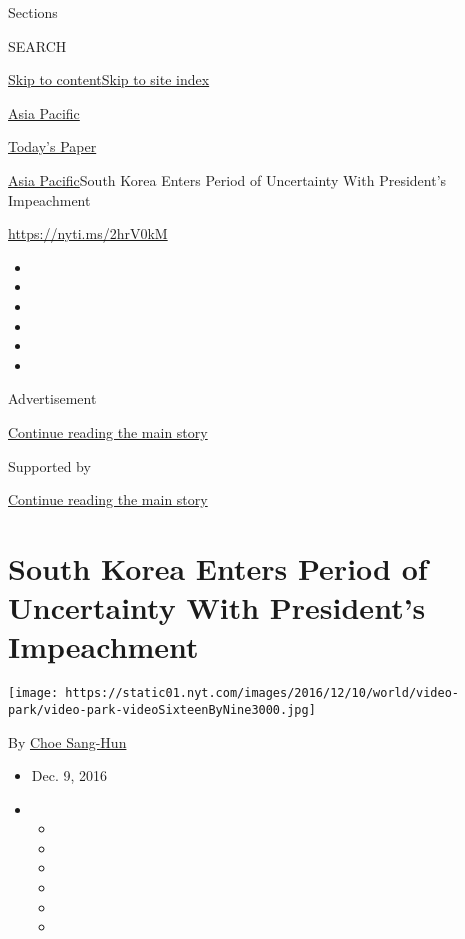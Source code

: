 Sections

SEARCH

\protect\hyperlink{site-content}{Skip to
content}\protect\hyperlink{site-index}{Skip to site index}

\href{https://www.nytimes.com/section/world/asia}{Asia Pacific}

\href{https://myaccount.nytimes.com/auth/login?response_type=cookie\&client_id=vi}{}

\href{https://www.nytimes.com/section/todayspaper}{Today's Paper}

\href{/section/world/asia}{Asia Pacific}\textbar{}South Korea Enters
Period of Uncertainty With President's Impeachment

\url{https://nyti.ms/2hrV0kM}

\begin{itemize}
\item
\item
\item
\item
\item
\item
\end{itemize}

Advertisement

\protect\hyperlink{after-top}{Continue reading the main story}

Supported by

\protect\hyperlink{after-sponsor}{Continue reading the main story}

\hypertarget{south-korea-enters-period-of-uncertainty-with-presidents-impeachment}{%
\section{South Korea Enters Period of Uncertainty With President's
Impeachment}\label{south-korea-enters-period-of-uncertainty-with-presidents-impeachment}}

\texttt{[image: https://static01.nyt.com/images/2016/12/10/world/video-park/video-park-videoSixteenByNine3000.jpg]}

By \href{http://www.nytimes.com/by/choe-sang-hun}{Choe Sang-Hun}

\begin{itemize}
\item
  Dec. 9, 2016
\item
  \begin{itemize}
  \item
  \item
  \item
  \item
  \item
  \item
  \end{itemize}
\end{itemize}

